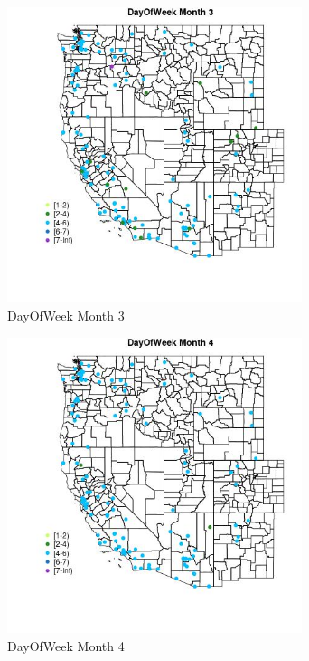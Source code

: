 \begin{figure} 
\centering  
\includegraphics[width=0.77\textwidth]{Code_Outputs/Report_ML_input_PM25_Step4_part_e_de_duplicated_aves_MapObsMo3DayOfWeek.jpg} 
\caption{\label{fig:Report_ML_input_PM25_Step4_part_e_de_duplicated_avesMapObsMo3DayOfWeek}DayOfWeek Month 3} 
\end{figure} 
 

\clearpage 

\begin{figure} 
\centering  
\includegraphics[width=0.77\textwidth]{Code_Outputs/Report_ML_input_PM25_Step4_part_e_de_duplicated_aves_MapObsMo4DayOfWeek.jpg} 
\caption{\label{fig:Report_ML_input_PM25_Step4_part_e_de_duplicated_avesMapObsMo4DayOfWeek}DayOfWeek Month 4} 
\end{figure} 
 

